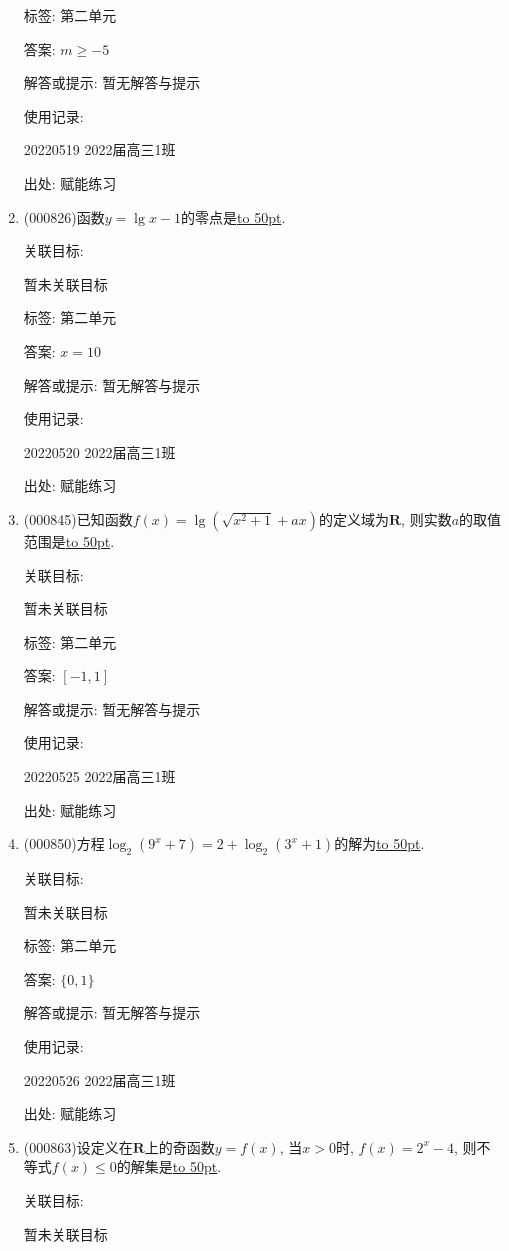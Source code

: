 \documentclass[10pt,a4paper]{article}
\newcommand{\blank}[1]{\underline{\hbox to #1pt{}}}
\begin{document}
\begin{enumerate}[1.]
标签: 第二单元

答案: $m\ge -5$

解答或提示: 暂无解答与提示

使用记录:

20220519	2022届高三1班	


出处: 赋能练习
\item { (000826)}函数$y=\lg x-1$的零点是\blank{50}.


关联目标:

暂未关联目标



标签: 第二单元

答案: $x=10$

解答或提示: 暂无解答与提示

使用记录:

20220520	2022届高三1班	


出处: 赋能练习
\item { (000845)}已知函数$f(x)=\lg (\sqrt{x^2+1}+ax)$的定义域为$\mathbf{R}$, 则实数$a$的取值范围是\blank{50}.


关联目标:

暂未关联目标



标签: 第二单元

答案: $[-1, 1]$

解答或提示: 暂无解答与提示

使用记录:

20220525	2022届高三1班	


出处: 赋能练习
\item { (000850)}方程$\log_2(9^x+7)=2+\log_2(3^x+1)$的解为\blank{50}.


关联目标:

暂未关联目标



标签: 第二单元

答案: $\{0,1\}$

解答或提示: 暂无解答与提示

使用记录:

20220526	2022届高三1班	


出处: 赋能练习
\item { (000863)}设定义在$\mathbf{R}$上的奇函数$y=f(x)$, 当$x>0$时, $f(x)=2^x-4$, 则不等式$f(x)\le 0$的解集是\blank{50}.


关联目标:

暂未关联目标




\end{enumerate}
\end{document}
